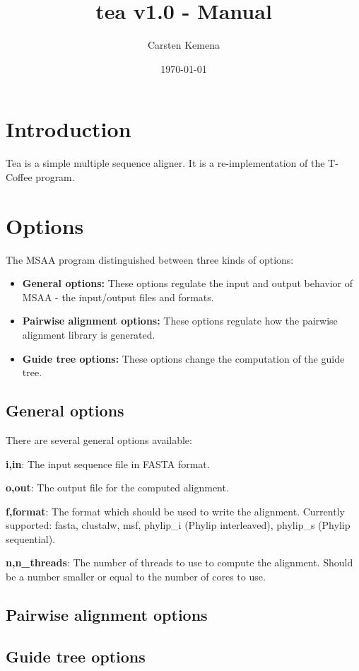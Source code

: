 \documentclass[a4paper,10pt]{scrartcl}
\title{tea v1.0 - Manual}
\author{Carsten Kemena}
\date{\today}
\begin{document}
\maketitle


\section{Introduction}
Tea is a simple multiple sequence aligner. It is a re-implementation of the T-Coffee program. 

\section{Options}
The MSAA program distinguished between three kinds of options:
\begin{itemize}
	\item \textbf{General options:} These options regulate the input and output behavior of MSAA - the input/output files and formats.
	\item \textbf{Pairwise alignment options:} These options regulate how the pairwise alignment library is generated.
	\item \textbf{Guide tree options:} These options change the computation of the guide tree.
\end{itemize}



\subsection{General options}
There are several general options available:

\textbf{i,in}: The input sequence file in FASTA format.

\textbf{o,out}: The output file for the computed alignment.

\textbf{f,format}: The format which should be used to write the alignment. Currently supported: fasta, clustalw, msf, phylip\_i (Phylip interleaved), phylip\_s (Phylip sequential).

\textbf{n,n\_threads}: The number of threads to use to compute the alignment. Should be a number smaller or equal to the number of cores to use.

\subsection{Pairwise alignment options}

\subsection{Guide tree options}
\end{document}
